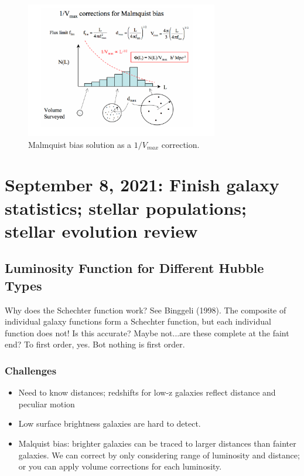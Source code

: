 \documentclass{article}
\begin{document}
\begin{figure}
    \centering
    \includegraphics[width=0.75\textwidth]{figs/Screen Shot 2021-09-03 at 11.31.42 AM.png}
    \caption{Malmquist bias solution as a $1/V_{max}$ correction. }
    \label{fig:malm_fix}
\end{figure}

\section{September 8, 2021: Finish galaxy statistics; stellar populations; stellar evolution review}

\subsection{Luminosity Function for Different Hubble Types}

Why does the Schechter function work? See Binggeli (1998). The composite of individual galaxy functions form a Schechter function, but each individual function does not! Is this accurate? Maybe not...are these complete at the faint end? To first order, yes. Bot nothing is first order.

\subsubsection{Challenges}

\begin{itemize}
    \item Need to know distances; redshifts for low-z galaxies reflect distance and peculiar motion
    \item Low surface brightness galaxies are hard to detect.
    \item Malquist bias: brighter galaxies can be traced to larger distances than fainter galaxies. We can correct by only considering range of luminosity and distance; or you can apply volume corrections for each luminosity. 
\end{itemize}
\end{document}

